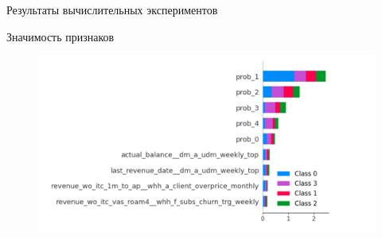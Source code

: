\documentclass[10pt,pdf,hyperref={unicode}]{beamer}
\renewcommand{\figurename}{}{}%
\renewcommand{\figurename}{\relax}%
\begin{document}
\begin{frame}{Результаты вычислительных экспериментов}
\begin{block}{Значимость признаков}
 	\begin{figure}[h!]
 	
 	\begin{minipage}{0.6\textwidth}
 		\centering
 		\includegraphics[width=\linewidth]{../figures/deephit_shap_baseline1.2.png}
 		\renewcommand{\figurename}{}{}%
 	\end{minipage}
 \end{figure}
 
	\end{block}
	
\end{frame}
\end{document}
